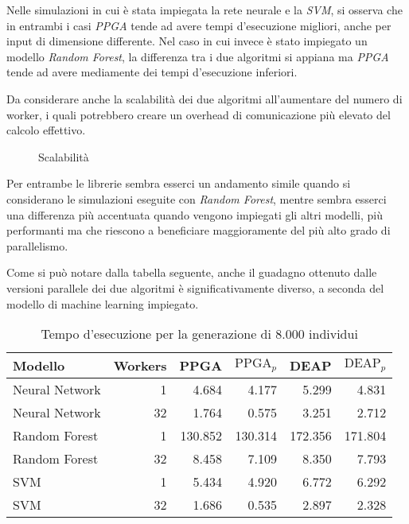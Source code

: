 Nelle simulazioni in cui è stata impiegata la rete neurale e la \textit{SVM},
si osserva che in entrambi i casi \textit{PPGA} tende ad avere tempi
d'esecuzione migliori, anche per input di dimensione differente. Nel caso in
cui invece è stato impiegato un modello \textit{Random Forest}, la differenza
tra i due algoritmi si appiana ma \textit{PPGA} tende ad avere mediamente dei
tempi d'esecuzione inferiori.

Da considerare anche la scalabilità dei due algoritmi all'aumentare del numero
di worker, i quali potrebbero creare un overhead di comunicazione più elevato
del calcolo effettivo.

\begin{figure}[H]
	\centering
	
	\caption{Scalabilità}
	\label{fig: scalability}
\end{figure}

Per entrambe le librerie sembra esserci un andamento simile quando si
considerano le simulazioni eseguite con \textit{Random Forest}, mentre sembra
esserci una differenza più accentuata quando vengono impiegati gli altri
modelli, più performanti ma che riescono a beneficiare maggioramente del più
alto grado di parallelismo.

Come si può notare dalla tabella seguente, anche il guadagno ottenuto dalle
versioni parallele dei due algoritmi è significativamente diverso, a seconda
del modello di machine learning impiegato.

\begin{table}[H]
	\centering
	\begin{tabular}{lrrrrr}
		\toprule
		Modello        & Workers & PPGA    & $\mathrm{PPGA}_p$ & DEAP    & $\mathrm{DEAP}_p$ \\
		\midrule
		Neural Network & 1       & 4.684   & 4.177             & 5.299   & 4.831             \\
		Neural Network & 32      & 1.764   & 0.575             & 3.251   & 2.712             \\
		Random Forest  & 1       & 130.852 & 130.314           & 172.356 & 171.804           \\
		Random Forest  & 32      & 8.458   & 7.109             & 8.350   & 7.793             \\
		SVM            & 1       & 5.434   & 4.920             & 6.772   & 6.292             \\
		SVM            & 32      & 1.686   & 0.535             & 2.897   & 2.328             \\
		\bottomrule
	\end{tabular}
	\caption{Tempo d'esecuzione per la generazione di $8.000$ individui}
	\label{tab: runtime}
\end{table}

